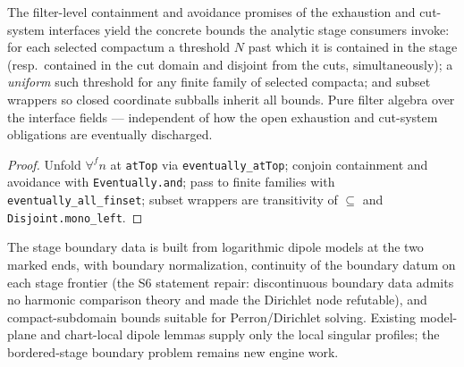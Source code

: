 \begin{lemma}
\label{lem:stage-eventual-containment-bounds}
The filter-level containment and avoidance promises of the exhaustion and
cut-system interfaces yield the concrete bounds the analytic stage
consumers invoke: for each selected compactum a threshold \(N\) past which
it is contained in the stage (resp.\ contained in the cut domain and
disjoint from the cuts, simultaneously); a \emph{uniform} such threshold
for any finite family of selected compacta; and subset wrappers so closed
coordinate subballs inherit all bounds.  Pure filter algebra over the
interface fields — independent of how the open exhaustion and cut-system
obligations are eventually discharged.
\leanok
\end{lemma}
\begin{proof}\leanok
Unfold \(\forall^f n\) at \texttt{atTop} via \texttt{eventually\_atTop};
conjoin containment and avoidance with \texttt{Eventually.and}; pass to
finite families with \texttt{eventually\_all\_finset}; subset wrappers are
transitivity of \(\subseteq\) and \texttt{Disjoint.mono\_left}.
\end{proof}

\begin{lemma}
\label{lem:stage-dipole-boundary-control}
The stage boundary data is built from logarithmic dipole models at the two
marked ends, with boundary normalization, continuity of the boundary datum on
each stage frontier (the S6 statement repair: discontinuous boundary data
admits no harmonic comparison theory and made the Dirichlet node refutable),
and compact-subdomain bounds suitable
for Perron/Dirichlet solving.  Existing model-plane and chart-local dipole
lemmas supply only the local singular profiles; the bordered-stage boundary
problem remains new engine work.
\end{lemma}

